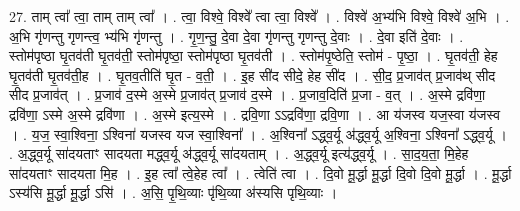 \documentclass[17pt]{extarticle}
\begin{document}
27. ताम् त्वा᳚ त्वा॒ ताम् ताम् त्वा᳚ । . त्वा॒ विश्वे॒ विश्वे᳚ त्वा त्वा॒ विश्वे᳚ । . विश्वे॑ अ॒भ्य॑भि विश्वे॒ विश्वे॑ अ॒भि । . अ॒भि गृ॑णन्तु गृणन्त्व॒ भ्य॑भि गृ॑णन्तु । . गृ॒ण॒न्तु॒ दे॒वा दे॒वा गृ॑णन्तु गृणन्तु दे॒वाः । . दे॒वा इति॑ दे॒वाः । . स्तोम॑पृष्ठा घृ॒तव॑ती घृ॒तव॑ती॒ स्तोम॑पृष्ठा॒ स्तोम॑पृष्ठा घृ॒तव॑ती । . स्तोम॑पृ॒ष्ठेति॒ स्तोम॑ - पृ॒ष्ठा॒ । . घृ॒तव॑ती॒ हेह घृ॒तव॑ती घृ॒तव॑ती॒ह । . घृ॒तव॒तीति॑ घृ॒त - व॒ती॒ । . इ॒ह सी॑द सीदे॒ हेह सी॑द । . सी॒द॒ प्र॒जाव॑त् प्र॒जाव॑थ् सीद सीद प्र॒जाव॑त् । . प्र॒जाव॑ द॒स्मे अ॒स्मे प्र॒जाव॑त् प्र॒जाव॑ द॒स्मे । . प्र॒जाव॒दिति॑ प्र॒जा - व॒त् । . अ॒स्मे द्रवि॑णा॒ द्रवि॑णा॒ ऽस्मे अ॒स्मे द्रवि॑णा । . अ॒स्मे इत्य॒स्मे । . द्रवि॒णा ऽऽद्रवि॑णा॒ द्रवि॒णा । . आ य॑जस्व यज॒स्वा य॑जस्व । . य॒ज॒ स्वा॒श्विना॒ ऽश्विना॑ यजस्व यज स्वा॒श्विना᳚ । . अ॒श्विना᳚ ऽद्ध्व॒र्यू अ॑द्ध्व॒र्यू अ॒श्विना॒ ऽश्विना᳚ ऽद्ध्व॒र्यू । . अ॒द्ध्व॒र्यू सा॑दयताꣳ सादयता मद्ध्व॒र्यू अ॑द्ध्व॒र्यू सा॑दयताम् । . अ॒द्ध्व॒र्यू इत्य॑द्ध्व॒र्यू । . सा॒द॒य॒ता॒ मि॒हेह सा॑दयताꣳ सादयता मि॒ह । . इ॒ह त्वा᳚ त्वे॒हेह त्वा᳚ । . त्वेति॑ त्वा । . दि॒वो मू॒र्द्धा मू॒र्द्धा दि॒वो दि॒वो मू॒र्द्धा । . मू॒र्द्धा ऽस्य॑सि मू॒र्द्धा मू॒र्द्धा ऽसि॑ । . अ॒सि॒ पृ॒थि॒व्याः पृ॑थि॒व्या अ॑स्यसि पृथि॒व्याः । \newline
\end{document}
